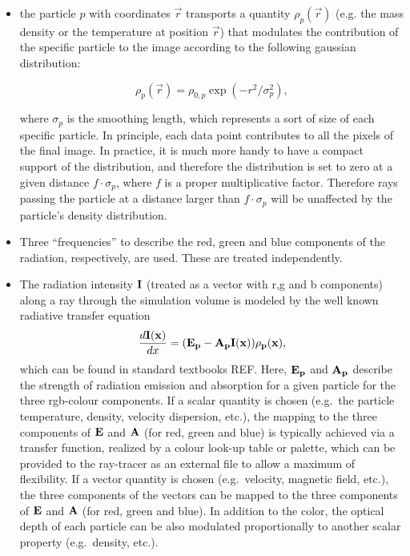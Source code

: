 \documentclass[11pt]{article}
\begin{document}
\begin{itemize}
\item
the particle $p$ with coordinates $\vec r$ transports a quantity $\rho_p(\vec r)$ 
(e.g. the mass density or the temperature at position $\vec r$)
that modulates the contribution of the specific particle to the image
according to the following gaussian distribution: 

\begin{equation}\label{smooth}
\rho_p(\vec r)=\rho_{0,p}\exp(-r^2/\sigma_p^2),
\end{equation}

where $\sigma_p$ is the smoothing length, which represents
a sort of size of each specific particle.  
In principle, each data point contributes to all the pixels of the final image.
In practice, it is much more handy to have a compact support of the
distribution, and therefore the distribution is set to zero at a given
distance $f\cdot\sigma_p$, where $f$ is a proper multiplicative factor.
Therefore rays passing
the particle at a distance larger than $f\cdot\sigma_p$ will be
unaffected by the particle's density distribution.

\item
Three ``frequencies'' to describe the red, green and blue
components of the radiation, respectively, are used. These are treated independently.

\item
The radiation intensity $\bf{I}$ (treated
as a vector with r,g and b components) along a ray through the simulation
volume is modeled by the well known radiative transfer equation
\begin{equation}\label{rad}
\frac{d\bf{I}(x)}{dx}=(\bf{E}_p-\bf{A}_p\bf{I}(x))\rho_p(x),
\end{equation}
which can be found in standard textbooks REF.
Here, $\bf{E}_p$ and $\bf{A}_p$ describe the strength of radiation emission and absorption
for a given particle for the three rgb-colour components. 
If a scalar quantity is chosen (e.g.\ the particle temperature,
density, velocity dispersion, etc.), the mapping to the three components of $\bf{E}$ and $\bf{A}$ (for red, green and blue)
is typically achieved via a transfer function, realized by a colour look-up table or palette, which can
be provided to the ray-tracer as an external file to allow a maximum of flexibility. If a
vector quantity is chosen (e.g.\ velocity, magnetic field, etc.), the three components of the vectors
can be mapped to the three components of $\bf{E}$ and $\bf{A}$ (for red, green and blue). In addition
to the color, the optical depth of each particle can be also modulated proportionally to another
scalar property (e.g.\ density, etc.).
\end{itemize}
\end{document}
